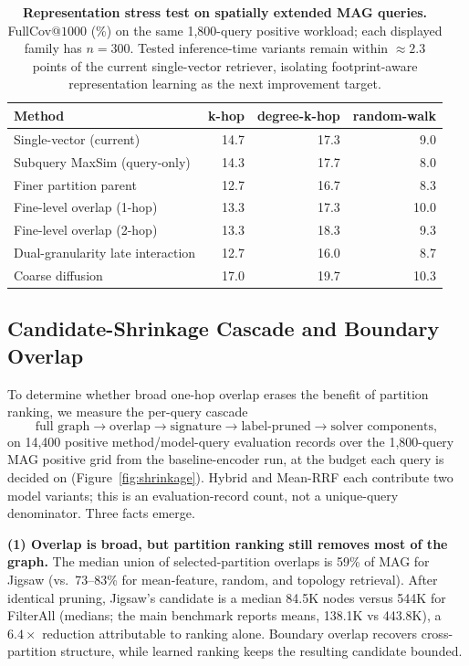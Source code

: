 \documentclass[runningheads]{llncs}
\begin{document}
\begin{table}[H]
\centering
\caption{\textbf{Representation stress test on spatially extended MAG queries.} FullCov@$1000$ (\%) on the same 1,800-query positive workload; each displayed family has $n{=}300$. Tested inference-time variants remain within ${\approx}2.3$ points of the current single-vector retriever, isolating footprint-aware representation learning as the next improvement target.}
\label{tab:probes}
\small
\setlength{\tabcolsep}{5pt}
\begin{tabular}{lrrr}
\toprule
\textbf{Method} & \textbf{k-hop} & \textbf{degree-k-hop} & \textbf{random-walk} \\
\midrule
Single-vector (current)            & 14.7 & 17.3 & 9.0 \\
Subquery MaxSim (query-only)       & 14.3 & 17.7 & 8.0 \\
Finer partition parent             & 12.7 & 16.7 & 8.3 \\
Fine-level overlap (1-hop)         & 13.3 & 17.3 & 10.0 \\
Fine-level overlap (2-hop)         & 13.3 & 18.3 & 9.3 \\
Dual-granularity late interaction  & 12.7 & 16.0 & 8.7 \\
Coarse diffusion                   & 17.0 & 19.7 & 10.3 \\
\bottomrule
\end{tabular}
\end{table}

\subsection{Candidate-Shrinkage Cascade and Boundary Overlap}
\label{sec:shrinkage}

To determine whether broad one-hop overlap erases the benefit of partition ranking, we measure the per-query cascade
\[
\text{full graph} \to \text{overlap} \to \text{signature} \to \text{label-pruned} \to \text{solver components},
\]
on 14{,}400 positive method/model-query evaluation records over the 1{,}800-query MAG positive grid from the baseline-encoder run, at the budget each query is decided on (Figure~\ref{fig:shrinkage}). Hybrid and Mean-RRF each contribute two model variants; this is an evaluation-record count, not a unique-query denominator. Three facts emerge.

\textbf{(1) Overlap is broad, but partition ranking still removes most of the graph.} The median union of selected-partition overlaps is 59\% of MAG for Jigsaw (vs.\ 73--83\% for mean-feature, random, and topology retrieval). After identical pruning, Jigsaw's candidate is a median 84.5K nodes versus 544K for FilterAll (medians; the main benchmark reports means, 138.1K vs 443.8K), a $6.4\times$ reduction attributable to ranking alone. Boundary overlap recovers cross-partition structure, while learned ranking keeps the resulting candidate bounded.
\end{document}
